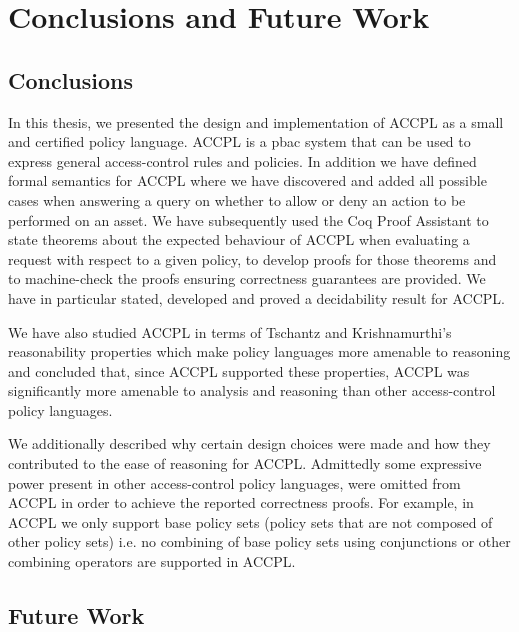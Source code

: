 \chapter{Conclusions and Future Work}

\section{Conclusions}

In this thesis, we presented the design and implementation of \ac{ACCPL} as a small and certified policy language. \ac{ACCPL} is a \ac{pbac} system that can be used to express general access-control rules and policies. In addition we have defined formal semantics for \ac{ACCPL} where we have discovered and added all possible cases when answering a query on whether to allow or deny an action to be performed on an asset. We have subsequently used the Coq Proof Assistant to state theorems about the expected behaviour of \ac{ACCPL} when evaluating a request with respect to a given policy, to develop proofs for those theorems and to machine-check the proofs ensuring correctness guarantees are provided. We have in particular stated, developed and proved a decidability result for \ac{ACCPL}. 

We have also studied \ac{ACCPL} in terms of Tschantz and Krishnamurthi's~\cite{Tschantz} reasonability properties which make policy languages more amenable to reasoning and concluded that, since \ac{ACCPL} supported these properties, \ac{ACCPL} was significantly more amenable to analysis and reasoning than other access-control policy languages. 

We additionally described why certain design choices were made and how they contributed to the ease of reasoning for \ac{ACCPL}. Admittedly some expressive power present in other access-control policy languages, were omitted from \ac{ACCPL} in order to achieve the reported correctness proofs. For example, in \ac{ACCPL} we only support base policy sets (policy sets that are not composed of other policy sets) i.e. no combining of base policy sets using conjunctions or other combining operators are supported in \ac{ACCPL}. 


\section{Future Work}

